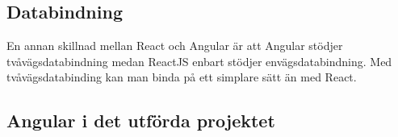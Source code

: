 \subsection{Databindning}
En annan skillnad mellan React och Angular är att Angular stödjer tvåvägsdatabindning medan ReactJS enbart stödjer envägsdatabindning. Med tvåvägsdatabinding kan man binda på ett simplare sätt än med React.

\subsection{Angular i det utförda projektet}

\pagebreak
 
